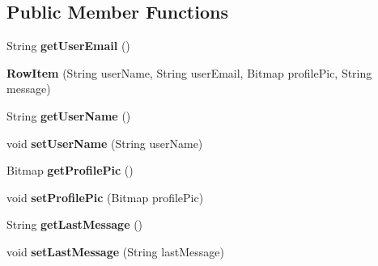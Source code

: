 \subsection*{Public Member Functions}
\begin{DoxyCompactItemize}
\item 
String {\bfseries get\+User\+Email} ()\hypertarget{classcom_1_1example_1_1sebastian_1_1tindertp_1_1chatListTools_1_1RowItem_ab9396b8753f2579319da75bd7e0e40ad}{}\label{classcom_1_1example_1_1sebastian_1_1tindertp_1_1chatListTools_1_1RowItem_ab9396b8753f2579319da75bd7e0e40ad}

\item 
{\bfseries Row\+Item} (String user\+Name, String user\+Email, Bitmap profile\+Pic, String message)\hypertarget{classcom_1_1example_1_1sebastian_1_1tindertp_1_1chatListTools_1_1RowItem_a47693de878f73e9cc07934a664e64f3d}{}\label{classcom_1_1example_1_1sebastian_1_1tindertp_1_1chatListTools_1_1RowItem_a47693de878f73e9cc07934a664e64f3d}

\item 
String {\bfseries get\+User\+Name} ()\hypertarget{classcom_1_1example_1_1sebastian_1_1tindertp_1_1chatListTools_1_1RowItem_a55b4c7a8bf2484b8c9bc538af08f7efd}{}\label{classcom_1_1example_1_1sebastian_1_1tindertp_1_1chatListTools_1_1RowItem_a55b4c7a8bf2484b8c9bc538af08f7efd}

\item 
void {\bfseries set\+User\+Name} (String user\+Name)\hypertarget{classcom_1_1example_1_1sebastian_1_1tindertp_1_1chatListTools_1_1RowItem_ad6f7e83a98b2abbbe8144162e2faabce}{}\label{classcom_1_1example_1_1sebastian_1_1tindertp_1_1chatListTools_1_1RowItem_ad6f7e83a98b2abbbe8144162e2faabce}

\item 
Bitmap {\bfseries get\+Profile\+Pic} ()\hypertarget{classcom_1_1example_1_1sebastian_1_1tindertp_1_1chatListTools_1_1RowItem_a7a32fd926bd5a0501be58d580b31d02e}{}\label{classcom_1_1example_1_1sebastian_1_1tindertp_1_1chatListTools_1_1RowItem_a7a32fd926bd5a0501be58d580b31d02e}

\item 
void {\bfseries set\+Profile\+Pic} (Bitmap profile\+Pic)\hypertarget{classcom_1_1example_1_1sebastian_1_1tindertp_1_1chatListTools_1_1RowItem_a8f3c4e9046813c91320fc63695d70c26}{}\label{classcom_1_1example_1_1sebastian_1_1tindertp_1_1chatListTools_1_1RowItem_a8f3c4e9046813c91320fc63695d70c26}

\item 
String {\bfseries get\+Last\+Message} ()\hypertarget{classcom_1_1example_1_1sebastian_1_1tindertp_1_1chatListTools_1_1RowItem_a532656b126c59fc35630c4c2cff81969}{}\label{classcom_1_1example_1_1sebastian_1_1tindertp_1_1chatListTools_1_1RowItem_a532656b126c59fc35630c4c2cff81969}

\item 
void {\bfseries set\+Last\+Message} (String last\+Message)\hypertarget{classcom_1_1example_1_1sebastian_1_1tindertp_1_1chatListTools_1_1RowItem_ad39bab2a02270542eadd4b1a4080510a}{}\label{classcom_1_1example_1_1sebastian_1_1tindertp_1_1chatListTools_1_1RowItem_ad39bab2a02270542eadd4b1a4080510a}

\end{DoxyCompactItemize}
